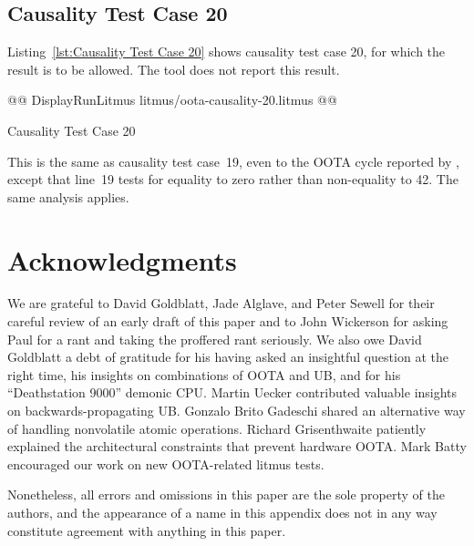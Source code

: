 \documentclass[10]{article}
\begin{document}
\subsection{Causality Test Case 20}
\label{app:Causality Test Case 20}

Listing~\ref{lst:Causality Test Case 20}
shows causality test case 20, for which the 
result is to be allowed.
The  tool does not report this result.

\begin{listing}[tbp]
@@ DisplayRunLitmus litmus/oota-causality-20.litmus @@
\caption{Causality Test Case 20}
\label{lst:Causality Test Case 20}
\end{listing}

This is the same as causality test case~19, even to the OOTA cycle
reported by , except that line~19 tests
 for equality to zero rather than non-equality to 42.
The same analysis applies.

\clearpage

\section{Acknowledgments}
\label{sec:Acknowledgments}

We are grateful to David Goldblatt, Jade Alglave, and Peter
Sewell for their careful review of an early draft of this paper and
to John Wickerson for asking Paul for a rant and taking the proffered
rant seriously.
We also owe David Goldblatt a debt of gratitude for his having asked an
insightful question at the right time, his insights on combinations of
OOTA and UB, and for his ``Deathstation 9000'' demonic CPU.
Martin Uecker contributed valuable insights on backwards-propagating UB.
Gonzalo Brito Gadeschi shared an alternative way of handling nonvolatile
atomic operations.
Richard Grisenthwaite patiently explained the architectural constraints
that prevent hardware OOTA.
Mark Batty encouraged our work on new OOTA-related litmus tests.

Nonetheless, all errors and omissions in this paper are the sole property
of the authors, and the appearance of a name in this appendix does
not in any way constitute agreement with anything in this paper.

\end{document}
